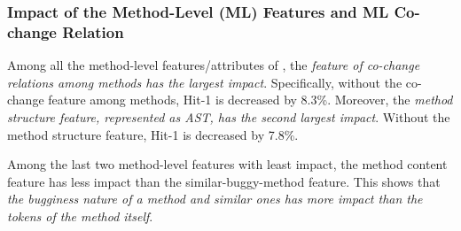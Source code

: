 
\vspace{-12pt}

\subsubsection{Impact of the Method-Level (ML) Features and ML Co-change Relation}


Among all the method-level features/attributes of {\tool}, the {\em
feature of co-change relations among methods has the largest impact}.
Specifically, without the co-change feature among methods, Hit-1 is
decreased by 8.3\%. Moreover, the {\it method structure feature,
represented as AST, has the second largest impact}. Without the
method structure feature, Hit-1 is decreased by 7.8\%.

Among the last two method-level features with least impact, the method
content feature has less impact than the similar-buggy-method
feature. This shows that {\em the bugginess nature of a method and
similar ones has more impact than the tokens of the method itself}.





